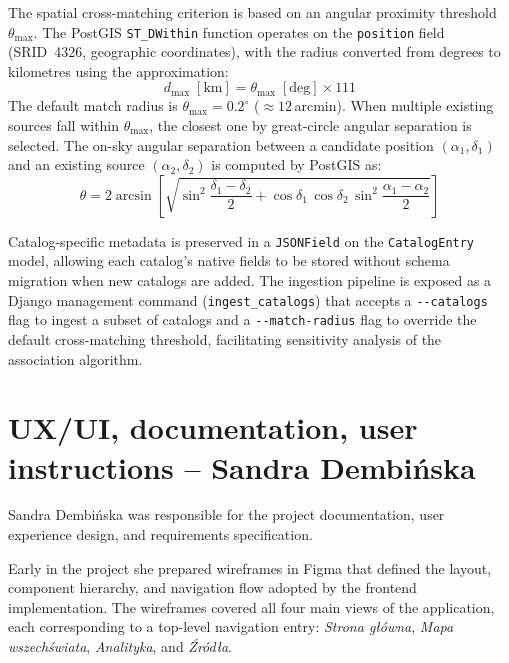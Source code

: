 \documentclass[11pt, a4paper]{article}
\begin{document}
The spatial cross-matching criterion is based on an angular proximity threshold $\theta_{\max}$.
The PostGIS \texttt{ST\_DWithin} function operates on the \texttt{position} field (SRID~4326, geographic coordinates), with the radius converted from degrees to kilometres using the approximation:
\begin{equation}
    d_{\max} \;[\text{km}] = \theta_{\max} \;[\text{deg}] \times 111
\end{equation}
The default match radius is $\theta_{\max} = 0.2^{\circ}$ ($\approx 12$\,arcmin).
When multiple existing sources fall within $\theta_{\max}$, the closest one by great-circle angular separation is selected.
The on-sky angular separation between a candidate position $(\alpha_1, \delta_1)$ and an existing source $(\alpha_2, \delta_2)$ is computed by PostGIS as:
\begin{equation}
    \theta = 2 \arcsin\!\left[\sqrt{\sin^2\!\frac{\delta_1 - \delta_2}{2} + \cos\delta_1\,\cos\delta_2\,\sin^2\!\frac{\alpha_1 - \alpha_2}{2}}\right]
\end{equation}

Catalog-specific metadata is preserved in a \texttt{JSONField} on the \texttt{CatalogEntry} model, allowing each catalog's native fields to be stored without schema migration when new catalogs are added.
The ingestion pipeline is exposed as a Django management command (\texttt{ingest\_catalogs}) that accepts a \texttt{-{}-catalogs} flag to ingest a subset of catalogs and a \texttt{-{}-match-radius} flag to override the default cross-matching threshold, facilitating sensitivity analysis of the association algorithm.

\section{UX/UI, documentation, user instructions -- Sandra Dembińska}

Sandra Dembińska was responsible for the project documentation, user experience design, and requirements specification.

Early in the project she prepared wireframes in Figma that defined the layout, component hierarchy, and navigation flow adopted by the frontend implementation.
The wireframes covered all four main views of the application, each corresponding to a top-level navigation entry: \emph{Strona główna}, \emph{Mapa wszechświata}, \emph{Analityka}, and \emph{Źródła}.
\end{document}
